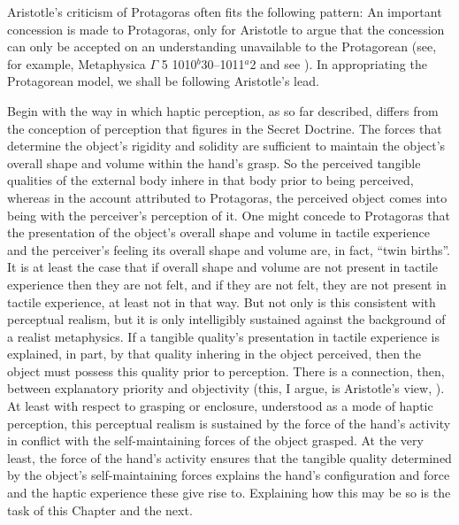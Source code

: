 Aristotle's criticism of Protagoras often fits the following pattern: An important concession is made to Protagoras, only for Aristotle to argue that the concession can only be accepted on an understanding unavailable to the Protagorean (see, for example, Metaphysica \( \Gamma \) 5 1010\( ^{b} \)30–1011\( ^{a} \)2 and see \citealt[Chapter 2.1.1, for discussion]{Kalderon:2015fr}). In appropriating the Protagorean model, we shall be following Aristotle's lead. 

Begin with the way in which haptic perception, as so far described, differs from the conception of perception that figures in the Secret Doctrine. The forces that determine the object's rigidity and solidity are sufficient to maintain the object's overall shape and volume within the hand's grasp. So the perceived tangible qualities of the external body inhere in that body prior to being perceived, whereas in the account attributed to Protagoras, the perceived object comes into being with the perceiver's perception of it. One might concede to Protagoras that the presentation of the object's overall shape and volume in tactile experience and the perceiver's feeling its overall shape and volume are, in fact, ``twin births''. It is at least the case that if overall shape and volume are not present in tactile experience then they are not felt, and if they are not felt, they are not present in tactile experience, at least not in that way. But not only is this consistent with perceptual realism, but it is only intelligibly sustained against the background of a realist metaphysics. If a tangible quality's presentation in tactile experience is explained, in part, by that quality inhering in the object perceived, then the object must possess this quality prior to perception. There is a connection, then, between explanatory priority and objectivity (this, I argue, is Aristotle's view, \citealt{Kalderon:2015fr}). At least with respect to grasping or enclosure, understood as a mode of haptic perception, this perceptual realism is sustained by the force of the hand's activity in conflict with the self-maintaining forces of the object grasped. At the very least, the force of the hand's activity ensures that the tangible quality determined by the object's self-maintaining forces explains the hand's configuration and force and the haptic experience these give rise to. Explaining how this may be so is the task of this Chapter and the next.

